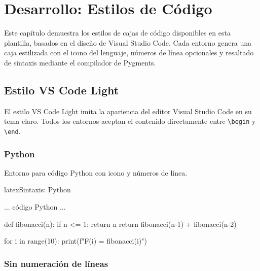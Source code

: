 \chapter{Desarrollo: Estilos de Código}
\label{chap:desarrollo}

Este capítulo demuestra los estilos de cajas de código disponibles en esta plantilla,
basados en el diseño de Visual Studio Code. Cada \gls{entorno} genera una caja estilizada
con el icono del lenguaje, números de línea opcionales y resaltado de sintaxis mediante
el \gls{compilador} de Pygments.

\section{Estilo VS Code Light}
\label{sec:vscode-light}

El estilo VS Code Light imita la apariencia del editor Visual Studio Code en su tema claro.
Todos los entornos aceptan el contenido directamente entre \texttt{\textbackslash begin} y
\texttt{\textbackslash end}.

\subsection{Python}

Entorno para código Python con icono  y números de línea.

\begin{codigosimple}{latex}{Sintaxis: Python}
\begin{pythoncode}
  ... código Python ...
\end{pythoncode}
\end{codigosimple}

\begin{pythoncode}
def fibonacci(n):
    if n <= 1:
        return n
    return fibonacci(n-1) + fibonacci(n-2)

for i in range(10):
    print(f"F({i}) = {fibonacci(i)}")
\end{pythoncode}

\subsection{Sin numeración de líneas}

